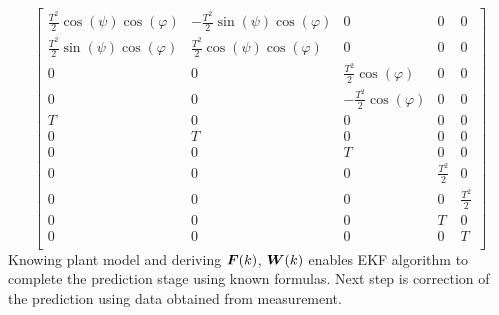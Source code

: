 $$ 
\begin{bmatrix}
\frac{T^{2}}{2}\cos(\psi)\cos(\varphi) & -\frac{T^{2}}{2}\sin(\psi)\cos(\varphi) & 0 & 0 & 0 \\
\frac{T^{2}}{2}\sin(\psi)\cos(\varphi) &  \frac{T^{2}}{2}\cos(\psi)\cos(\varphi) & 0 & 0 & 0 \\
0 & 0 & \frac{T^{2}}{2}\cos(\varphi) & 0 & 0 \\
0 & 0 & -\frac{T^{2}}{2}\cos(\varphi) & 0 & 0 \\
T & 0 & 0 & 0 & 0 \\
0 & T & 0 & 0 & 0 \\
0 & 0 & T & 0 & 0 \\
0 & 0 & 0 & \frac{T^{2}}{2} & 0 \\
0 & 0 & 0 & 0 & \frac{T^{2}}{2} \\
0 & 0 & 0 & T & 0 \\
0 & 0 & 0 & 0 & T \\
\end{bmatrix}
$$
Knowing plant model and deriving $\boldsymbol{F}(k)$, $\boldsymbol{W}(k)$ enables EKF algorithm to complete the prediction stage using known formulas. Next step is correction of the prediction using data obtained from measurement.
